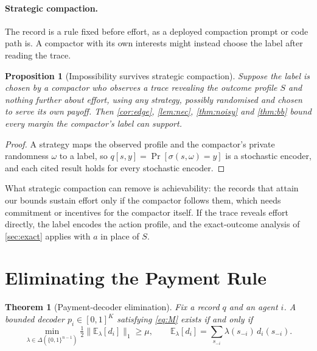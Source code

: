 \documentclass[sigconf,anonymous,acmthm=false]{acmart}
\theoremstyle{acmplain}
\newtheorem{theorem}{Theorem}
\newtheorem{proposition}{Proposition}
\theoremstyle{acmdefinition}
\newcommand{\E}{\mathbb{E}}
\newcommand{\cube}{\{0,1\}}
\begin{document}
\paragraph{Strategic compaction.} The record is a rule fixed before effort, as a deployed
compaction prompt or code path is. A compactor with its own interests might instead choose
the label after reading the trace.

\begin{proposition}[Impossibility survives strategic compaction]\label{prop:strategic}
Suppose the label is chosen by a compactor who observes a trace revealing the outcome profile
$S$ and nothing further about effort, using any strategy, possibly randomised and chosen to
serve its own payoff. Then \cref{cor:edge}, \cref{lem:nec}, \cref{thm:noisy} and
\cref{thm:bb} bound every margin the compactor's label can support.
\end{proposition}
\begin{proof}
A strategy maps the observed profile and the compactor's private randomness $\omega$ to a
label, so $q[s,y]=\Pr[\sigma(s,\omega)=y]$ is a stochastic encoder, and each cited result
holds for every stochastic encoder.
\end{proof}

What strategic compaction can remove is achievability: the records that attain our bounds
sustain effort only if the compactor follows them, which needs commitment or incentives for
the compactor itself. If the trace reveals effort directly, the label encodes the action
profile, and the exact-outcome analysis of \cref{sec:exact} applies with $a$ in place of $S$.

\section{Eliminating the Payment Rule}\label{sec:elim}

\begin{theorem}[Payment-decoder elimination]\label{thm:elim}
Fix a record $q$ and an agent $i$. A bounded decoder $p_i\in[0,1]^K$ satisfying
\eqref{eq:M} exists if and only if
\[ \min_{\lambda\in\Delta(\cube^{n-1})}\tfrac12\big\|\E_\lambda[d_i]\big\|_1\ge\mu,
\qquad\E_\lambda[d_i]=\textstyle\sum_{s_{-i}}\lambda(s_{-i})\,d_i(s_{-i}). \]
\end{theorem}
\end{document}
